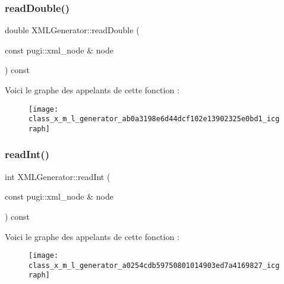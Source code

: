 \subsubsection{\texorpdfstring{read\+Double()}{readDouble()}}
{\footnotesize\ttfamily double X\+M\+L\+Generator\+::read\+Double (\begin{DoxyParamCaption}\item[{const pugi\+::xml\+\_\+node \&}]{node }\end{DoxyParamCaption}) const\hspace{0.3cm}{\ttfamily [private]}}

Voici le graphe des appelants de cette fonction \+:
\nopagebreak
\begin{figure}[H]
\begin{center}
\leavevmode
\texttt{[image: class\_x\_m\_l\_generator\_ab0a3198e6d44dcf102e13902325e0bd1\_icgraph]}
\end{center}
\end{figure}
\mbox{\label{class_x_m_l_generator_a0254cdb59750801014903ed7a4169827}} 
\subsubsection{\texorpdfstring{read\+Int()}{readInt()}}
{\footnotesize\ttfamily int X\+M\+L\+Generator\+::read\+Int (\begin{DoxyParamCaption}\item[{const pugi\+::xml\+\_\+node \&}]{node }\end{DoxyParamCaption}) const\hspace{0.3cm}{\ttfamily [private]}}

Voici le graphe des appelants de cette fonction \+:
\nopagebreak
\begin{figure}[H]
\begin{center}
\leavevmode
\texttt{[image: class\_x\_m\_l\_generator\_a0254cdb59750801014903ed7a4169827\_icgraph]}
\end{center}
\end{figure}
\mbox{\label{class_x_m_l_generator_abf2e3d3b2d44fdd1e01d0f2bbca7f028}} 
